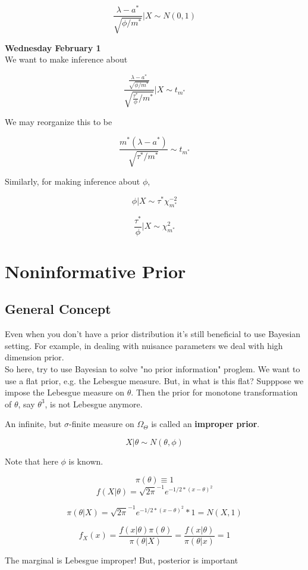 \documentclass[11pt,fleqn]{book} %
\begin{document}
		$$\frac{\lambda - a^*}{\sqrt{\phi/m^*}} | X \sim N(0, 1) $$

\textbf{Wednesday February 1}\\

We want to make inference about 

		$$\frac{\frac{\lambda - a^*}{\sqrt{\phi/m^*}}}{\sqrt{\frac{\tau^*}{\phi}/m^*}} | X \sim t_{m^*} $$

We may reorganize this to be 


		$$\frac{m^*(\lambda - a^*)}{\sqrt{\tau^*/m^*}}\sim t_{m^*} $$


Similarly, for making inference about $\phi$, 

		$$\phi | X \sim \tau^* \chi^{-2}_{m^*} $$

		$$\frac{\tau^*}{\phi}|X \sim \chi^2_{m^*} $$


\section{Noninformative Prior}

\subsection{General Concept}

Even when you don't have a prior distribution it's still beneficial to use Bayesian setting. For example, in dealing with nuisance parameters we deal with high dimension prior. \\

So here, try to use Bayesian to solve "no prior information" proglem. We want to use a flat prior, e.g. the Lebesgue measure. But, in what is this flat? Supppose we impose the Lebesgue measure on $\theta$. Then the prior for monotone transformation of $\theta$, say $\theta^3$, is not Lebesgue anymore. 


\begin{definition}
	An infinite, but $\sigma$-finite measure on $\Omega_\Theta$ is called an \textbf{improper prior}.
\end{definition}

\begin{example}
			$$ X|\theta \sim N(\theta, \phi) $$

	Note that here $\phi$ is known. 

	$$\pi(\theta) \equiv 1 $$
	$$f(X|\theta) = \sqrt{2\pi}^{-1} e^{-1/2 * (x - \theta)^2} $$

	$$\pi(\theta|X) = \sqrt{2\pi}^{-1} e^{-1/2 * (x - \theta)^2} * 1  = N(X, 1)$$

	$$f_X(x) = \frac{f(x|\theta) \pi(\theta)}{\pi(\theta|X)} = \frac{f(x|\theta)}{\pi(\theta|x)} = 1$$

	The marginal is Lebesgue improper! But, posterior is important
\end{example}
\end{document}
